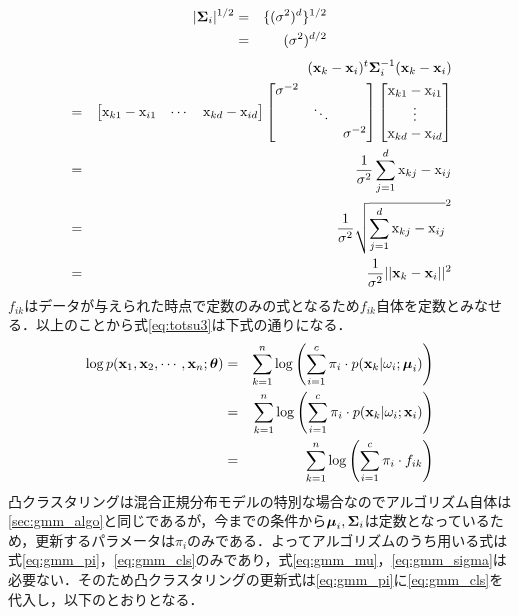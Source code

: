 \documentclass[a4j]{jsarticle}
\def\vec#1{\mbox{\boldmath $#1$}}
\begin{document}
\begin{eqnarray}
	|\vec\Sigma_i|^{1/2} &=& \{(\sigma^2)^d\}^{1/2} \nonumber \\
	&=& (\sigma^2)^{d/2}
\end{eqnarray}
\begin{eqnarray}
	&&(\textbf{x}_k - \textbf{x}_i)^t \vec\Sigma_i^{-1}(\textbf{x}_k - \textbf{x}_i) \nonumber \\
	&=&
	\begin{bmatrix}
		\textmd{x}_{k1}-\textmd{x}_{i1} & \cdots & \textmd{x}_{kd}-\textmd{x}_{id} \\
	\end{bmatrix}
	\begin{bmatrix}
		\sigma^{-2} & & \\
		& \ddots & \\
		& & \sigma^{-2} \\
	\end{bmatrix}
	\begin{bmatrix}
		\textmd{x}_{k1}-\textmd{x}_{i1} \\
		\vdots \\
		\textmd{x}_{kd}-\textmd{x}_{id}
	\end{bmatrix} \nonumber\\
	&=& \frac{1}{\sigma^2}\sum_{j=1}^{d}\textmd{x}_{kj}-\textmd{x}_{ij} \nonumber\\
	&=& \frac{1}{\sigma^2}\sqrt{\sum_{j=1}^{d}\textmd{x}_{kj}-\textmd{x}_{ij}}^2 \nonumber\\
	&=& \frac{1}{\sigma^2}||\textbf{x}_k - \textbf{x}_i||^2
\end{eqnarray}
$f_{ik}$はデータが与えられた時点で定数のみの式となるため$f_{ik}$自体を定数とみなせる．以上のことから式\ref{eq:totsu3}は下式の通りになる．
\begin{eqnarray}
		\label{eq:totsu_saidai}
		\log p(\textbf{x}_1,\textbf{x}_2,\cdots,\textbf{x}_n;\vec\theta) &=& \sum_{k=1}^{n}\log\left(\sum_{i=1}^{c}\pi_i\cdot p(\textbf{x}_k|\omega_i;\vec\mu_i)\right) \nonumber \\
		&=& \sum_{k=1}^{n}\log\left(\sum_{i=1}^{c}\pi_i\cdot p(\textbf{x}_k|\omega_i;\textbf{x}_i)\right) \nonumber \\
		&=& \sum_{k=1}^{n}\log\left(\sum_{i=1}^{c}\pi_i\cdot f_{ik} \right)
\end{eqnarray}
凸クラスタリングは混合正規分布モデルの特別な場合なのでアルゴリズム自体は\ref{sec:gmm_algo}と同じであるが，今までの条件から$\vec\mu_i, \vec\Sigma_i$は定数となっているため，更新するパラメータは$\pi_i$のみである．よってアルゴリズムのうち用いる式は式\ref{eq:gmm_pi}，\ref{eq:gmm_cls}のみであり，式\ref{eq:gmm_mu}，\ref{eq:gmm_sigma}は必要ない．そのため凸クラスタリングの更新式は\ref{eq:gmm_pi}に\ref{eq:gmm_cls}を代入し，以下のとおりとなる．
\end{document}
